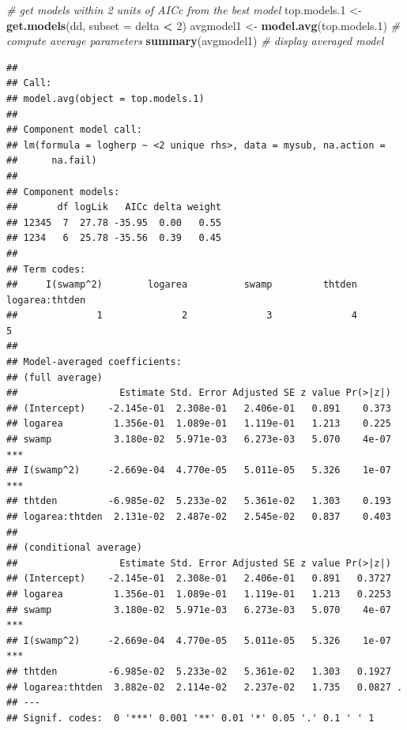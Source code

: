 \documentclass[
  12pt,
]{book}
\newenvironment{Shaded}{\begin{snugshade}}{\end{snugshade}}
\newcommand{\CommentTok}[1]{\textcolor[rgb]{0.56,0.35,0.01}{\textit{#1}}}
\newcommand{\DataTypeTok}[1]{\textcolor[rgb]{0.13,0.29,0.53}{#1}}
\newcommand{\DecValTok}[1]{\textcolor[rgb]{0.00,0.00,0.81}{#1}}
\newcommand{\FloatTok}[1]{\textcolor[rgb]{0.00,0.00,0.81}{#1}}
\newcommand{\KeywordTok}[1]{\textcolor[rgb]{0.13,0.29,0.53}{\textbf{#1}}}
\newcommand{\NormalTok}[1]{#1}
\newcommand{\OperatorTok}[1]{\textcolor[rgb]{0.81,0.36,0.00}{\textbf{#1}}}
\newcommand{\StringTok}[1]{\textcolor[rgb]{0.31,0.60,0.02}{#1}}
\begin{document}
\begin{Shaded}
\begin{Highlighting}[]
\CommentTok{\# get models within 2 units of AICc from the best model}
\NormalTok{top.models}\FloatTok{.1}\NormalTok{ \textless{}{-}}\StringTok{ }\KeywordTok{get.models}\NormalTok{(dd, }\DataTypeTok{subset =}\NormalTok{ delta }\OperatorTok{\textless{}}\StringTok{ }\DecValTok{2}\NormalTok{)}
\NormalTok{avgmodel1 \textless{}{-}}\StringTok{ }\KeywordTok{model.avg}\NormalTok{(top.models}\FloatTok{.1}\NormalTok{) }\CommentTok{\# compute average parameters}
\KeywordTok{summary}\NormalTok{(avgmodel1) }\CommentTok{\# display averaged model}
\end{Highlighting}
\end{Shaded}

\begin{verbatim}
## 
## Call:
## model.avg(object = top.models.1)
## 
## Component model call: 
## lm(formula = logherp ~ <2 unique rhs>, data = mysub, na.action = 
##      na.fail)
## 
## Component models: 
##       df logLik   AICc delta weight
## 12345  7  27.78 -35.95  0.00   0.55
## 1234   6  25.78 -35.56  0.39   0.45
## 
## Term codes: 
##     I(swamp^2)        logarea          swamp         thtden logarea:thtden 
##              1              2              3              4              5 
## 
## Model-averaged coefficients:  
## (full average) 
##                  Estimate Std. Error Adjusted SE z value Pr(>|z|)    
## (Intercept)    -2.145e-01  2.308e-01   2.406e-01   0.891    0.373    
## logarea         1.356e-01  1.089e-01   1.119e-01   1.213    0.225    
## swamp           3.180e-02  5.971e-03   6.273e-03   5.070    4e-07 ***
## I(swamp^2)     -2.669e-04  4.770e-05   5.011e-05   5.326    1e-07 ***
## thtden         -6.985e-02  5.233e-02   5.361e-02   1.303    0.193    
## logarea:thtden  2.131e-02  2.487e-02   2.545e-02   0.837    0.403    
##  
## (conditional average) 
##                  Estimate Std. Error Adjusted SE z value Pr(>|z|)    
## (Intercept)    -2.145e-01  2.308e-01   2.406e-01   0.891   0.3727    
## logarea         1.356e-01  1.089e-01   1.119e-01   1.213   0.2253    
## swamp           3.180e-02  5.971e-03   6.273e-03   5.070    4e-07 ***
## I(swamp^2)     -2.669e-04  4.770e-05   5.011e-05   5.326    1e-07 ***
## thtden         -6.985e-02  5.233e-02   5.361e-02   1.303   0.1927    
## logarea:thtden  3.882e-02  2.114e-02   2.237e-02   1.735   0.0827 .  
## ---
## Signif. codes:  0 '***' 0.001 '**' 0.01 '*' 0.05 '.' 0.1 ' ' 1
\end{verbatim}
\end{document}
